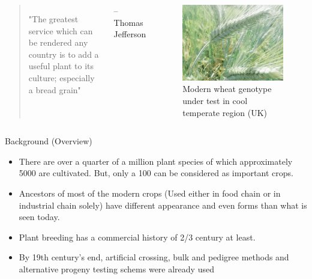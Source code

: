\documentclass[11pt,ignorenonframetext,aspectratio=169]{beamer}
\providecommand{\tightlist}{%
  \setlength{\itemsep}{0pt}\setlength{\parskip}{0pt}}
\begin{document}
\begin{frame}{}
\protect\hypertarget{section-1}{}
\begin{columns}[T,c,onlytextwidth]

\begin{quote}
\vfill
"The greatest service which can be rendered any country is to add a useful plant to its culture; especially a bread grain"
\end{quote}
\hfill\raggedright{\footnotesize -- Thomas Jefferson}


\begin{figure}
\includegraphics[width=0.75\linewidth]{./images/Triticum3} \caption{Modern wheat genotype under test in cool temperate region (UK)}\label{fig:modern-triticum-uk}
\end{figure}

\end{columns}
\end{frame}

\begin{frame}{Background (Overview)}
\protect\hypertarget{background-overview}{}
\begin{itemize}
\tightlist
\item
  There are over a quarter of a million plant species of which
  approximately 5000 are cultivated. But, only a 100 can be considered
  as important crops.
\item
  Ancestors of most of the modern crops (Used either in food chain or in
  industrial chain solely) have different appearance and even forms than
  what is seen today.
\item
  Plant breeding has a commercial history of 2/3 century at least.
\item
  By 19th century's end, artificial crossing, bulk and pedigree methods
  and alternative progeny testing schems were already used
\end{itemize}
\end{frame}
\end{document}
